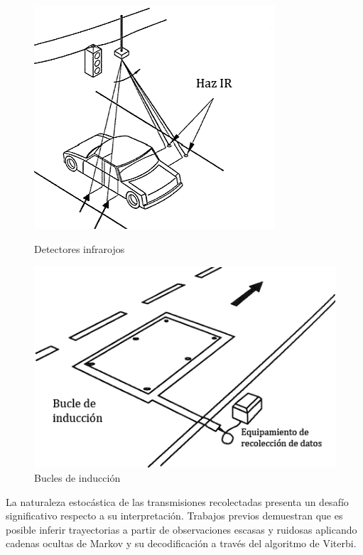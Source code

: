 \begin{figure}[!htb]
\centering
\begin{minipage}{.45\textwidth}
    \centering
    \includegraphics[height=0.2\textheight]{images/detector-infrarrojo.png}
    \caption {Detectores infrarojos}
    \label{fig:IRDetector}  
\end{minipage}
\begin{minipage}{.45\textwidth}
    \centering
    \includegraphics[height=0.2\textheight]{images/detector-inductionloop.png}
    \caption {Bucles de inducción}
    \label{fig:ILDetector}  
\end{minipage}
\end{figure}

La naturaleza estocástica de las transmisiones recolectadas presenta un desafío significativo respecto a su interpretación. Trabajos previos\cite{lou2009map,thiagarajan2009vtrack,wei2012fast} demuestran que es posible inferir trayectorias a partir de observaciones escasas y ruidosas aplicando cadenas ocultas de Markov y su decodificación a través del algoritmo de Viterbi.

